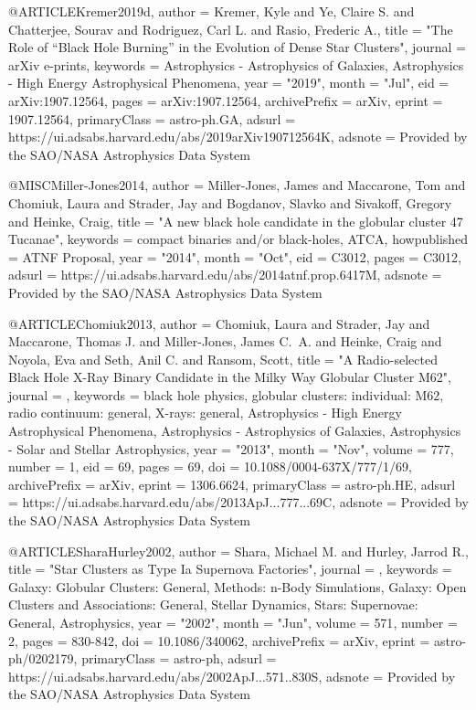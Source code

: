 \documentclass[twocolumn,tighten]{aastex63}
\begin{document}
{@ARTICLE{Kremer2019d,
       author = {{Kremer}, Kyle and {Ye}, Claire S. and {Chatterjee}, Sourav and
         {Rodriguez}, Carl L. and {Rasio}, Frederic A.},
        title = "{The Role of ``Black Hole Burning'' in the Evolution of Dense Star Clusters}",
      journal = {arXiv e-prints},
     keywords = {Astrophysics - Astrophysics of Galaxies, Astrophysics - High Energy Astrophysical Phenomena},
         year = "2019",
        month = "Jul",
          eid = {arXiv:1907.12564},
        pages = {arXiv:1907.12564},
archivePrefix = {arXiv},
       eprint = {1907.12564},
 primaryClass = {astro-ph.GA},
       adsurl = {https://ui.adsabs.harvard.edu/abs/2019arXiv190712564K},
      adsnote = {Provided by the SAO/NASA Astrophysics Data System}
}

@MISC{Miller-Jones2014,
       author = {{Miller-Jones}, James and {Maccarone}, Tom and {Chomiuk}, Laura and
         {Strader}, Jay and {Bogdanov}, Slavko and {Sivakoff}, Gregory and
         {Heinke}, Craig},
        title = "{A new black hole candidate in the globular cluster 47 Tucanae}",
     keywords = {compact binaries and/or black-holes, ATCA},
 howpublished = {ATNF Proposal},
         year = "2014",
        month = "Oct",
          eid = {C3012},
        pages = {C3012},
       adsurl = {https://ui.adsabs.harvard.edu/abs/2014atnf.prop.6417M},
      adsnote = {Provided by the SAO/NASA Astrophysics Data System}
}

@ARTICLE{Chomiuk2013,
       author = {{Chomiuk}, Laura and {Strader}, Jay and {Maccarone}, Thomas J. and
         {Miller-Jones}, James C.~A. and {Heinke}, Craig and {Noyola}, Eva and
         {Seth}, Anil C. and {Ransom}, Scott},
        title = "{A Radio-selected Black Hole X-Ray Binary Candidate in the Milky Way Globular Cluster M62}",
      journal = {\apj},
     keywords = {black hole physics, globular clusters: individual: M62, radio continuum: general, X-rays: general, Astrophysics - High Energy Astrophysical Phenomena, Astrophysics - Astrophysics of Galaxies, Astrophysics - Solar and Stellar Astrophysics},
         year = "2013",
        month = "Nov",
       volume = {777},
       number = {1},
          eid = {69},
        pages = {69},
          doi = {10.1088/0004-637X/777/1/69},
archivePrefix = {arXiv},
       eprint = {1306.6624},
 primaryClass = {astro-ph.HE},
       adsurl = {https://ui.adsabs.harvard.edu/abs/2013ApJ...777...69C},
      adsnote = {Provided by the SAO/NASA Astrophysics Data System}
}

@ARTICLE{SharaHurley2002,
       author = {{Shara}, Michael M. and {Hurley}, Jarrod R.},
        title = "{Star Clusters as Type Ia Supernova Factories}",
      journal = {\apj},
     keywords = {Galaxy: Globular Clusters: General, Methods: n-Body Simulations, Galaxy: Open Clusters and Associations: General, Stellar Dynamics, Stars: Supernovae: General, Astrophysics},
         year = "2002",
        month = "Jun",
       volume = {571},
       number = {2},
        pages = {830-842},
          doi = {10.1086/340062},
archivePrefix = {arXiv},
       eprint = {astro-ph/0202179},
 primaryClass = {astro-ph},
       adsurl = {https://ui.adsabs.harvard.edu/abs/2002ApJ...571..830S},
      adsnote = {Provided by the SAO/NASA Astrophysics Data System}
}

}
\end{document}
